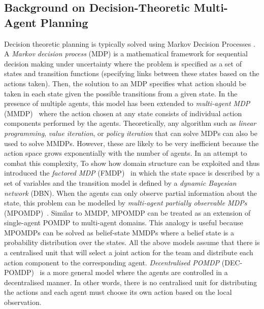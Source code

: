 \subsection{Background on Decision-Theoretic Multi-Agent Planning}
Decision theoretic planning is typically solved using Markov Decision Processes \cite{xx}. A {\em Markov decision process} (MDP) is a mathematical framework for sequential decision making under uncertainty where the problem is specified as a set of states and transition functions (specifying links between these states based on the actions taken). Then, the solution to an MDP specifies what action should be taken in each state given the possible transitions from a given state. In the presence of multiple agents, this model has been extended to {\em multi-agent MDP} (MMDP)~\cite{boutilier1996planning} where the action chosen at any state consists of individual action components performed by the agents. Theoretically, any algorithm such as {\em linear programming}, {\em value iteration}, or {\em policy iteration} that can solve MDPs can also be used to solve MMDPs. However, these are likely to be very inefficient because the action space grows exponentially with the number of agents. In an attempt to combat this complexity, To \cite{boutilier2000stochastic} show how  domain structure can be exploited and  thus introduced the {\em factored MDP} (FMDP)~  in which the state space is described by a set of variables and the transition model is defined by a {\em dynamic Bayesian network} (DBN). When the agents can only observe partial
information about the state, this problem can be modelled by {\em multi-agent partially observable MDPs} (MPOMDP)~\cite{pynadath2002communicative}. Similar to MMDP, MPOMDP can be treated as an extension of single-agent POMDP to multi-agent domains. This analogy is useful because MPOMDPs can be solved as belief-state MMDPs where a belief state is a probability distribution over the states. All the above models assume that there is a centralised unit that will select a joint action for the team and distribute each action component to the corresponding agent. {\em Decentralised POMDP} (DEC-POMDP)~\cite{bernstein2002complexity} is a more general model where the agents are controlled in a decentralised manner. In other words, there is no centralised unit for distributing the actions and each agent must choose its own action based on the local observation.

